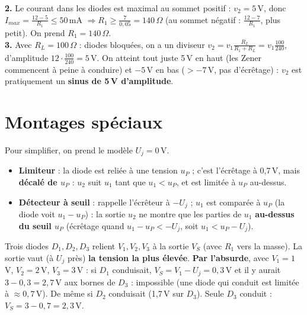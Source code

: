 \begin{exbox}[title={Questions 2 et 3 : solution proposée (pas dans les slides ; on prend 12\,V comme amplitude)}]
\textbf{2.} Le courant dans les diodes est maximal au sommet positif : $v_2 = 5$\,V, donc
$I_{max} = \frac{12 - 5}{R_1} \le 50$\,mA $\Rightarrow R_1 \ge \frac{7}{0{,}05} = 140\,\Omega$
(au sommet négatif : $\frac{12 - 7}{R_1}$, plus petit). On prend $R_1 = 140\,\Omega$. \\
\textbf{3.} Avec $R_L = 100\,\Omega$ : diodes bloquées, on a un diviseur
$v_2 = v_1\frac{R_L}{R_1 + R_L} = v_1\frac{100}{240}$, d'amplitude $12\cdot\frac{100}{240} = 5$\,V.
On atteint tout juste 5\,V en haut (les Zener commencent à peine à conduire) et $-5$\,V en bas
($> -7$\,V, pas d'écrêtage) : $v_2$ est pratiquement un \textbf{sinus de 5\,V d'amplitude}.
\end{exbox}

\section{Montages spéciaux}


\begin{propbox}[title=Limiteur et détecteur à seuil]
Pour simplifier, on prend le modèle $U_j = 0$\,V.
\begin{itemize}
  \item \textbf{Limiteur} : la diode est reliée à une tension $u_P$ ; c'est l'écrêtage à
        0,7\,V, mais \textbf{décalé de $u_P$} : $u_2$ suit $u_1$ tant que $u_1 < u_P$, et
        est limitée à $u_P$ au-dessus.
  \item \textbf{Détecteur à seuil} : rappelle l'écrêteur à $-U_j$ ; $u_1$ est comparée à
        $u_P$ (la diode voit $u_1 - u_P$) : la sortie $u_2$ ne montre que les parties de
        $u_1$ \textbf{au-dessus du seuil $u_P$} (écrêtage quand $u_1 - u_P < -U_j$, soit
        $u_1 < u_P - U_j$).
\end{itemize}
\end{propbox}


\begin{exbox}[title={Détecteur de tension la plus élevée}]
Trois diodes $D_1, D_2, D_3$ relient $V_1, V_2, V_3$ à la sortie $V_S$ (avec $R_1$ vers la
masse). La sortie vaut (à $U_j$ près) \textbf{la tension la plus élevée}. \textbf{Par
l'absurde}, avec $V_1 = 1$\,V, $V_2 = 2$\,V, $V_3 = 3$\,V : si $D_1$ conduisait,
$V_S = V_1 - U_j = 0{,}3$\,V et il y aurait $3 - 0{,}3 = 2{,}7$\,V aux bornes de $D_3$ :
impossible (une diode qui conduit est limitée à $\approx0{,}7$\,V). De même si $D_2$
conduisait (1,7\,V sur $D_3$). Seule $D_3$ conduit : $V_S = 3 - 0{,}7 = 2{,}3$\,V.
\end{exbox}

